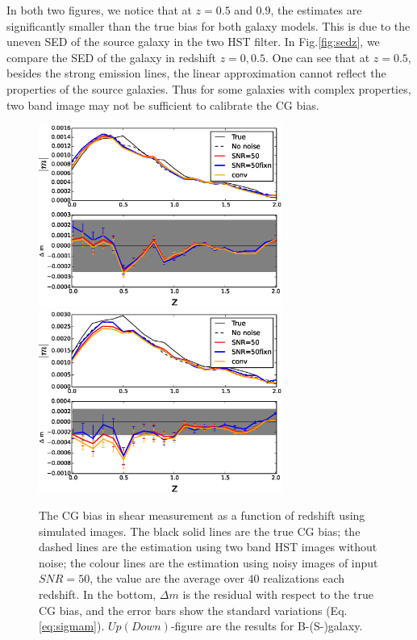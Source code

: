 \documentclass[useAMS,usenatbib]{mn2e}
\begin{document}
In both two figures, we notice that at $z=0.5$ and $0.9$, the estimates are
significantly smaller than the true bias for both galaxy models. This is
due to the uneven SED of the source galaxy in the two HST filter. In
Fig.\ref{fig:sedz}, we compare the SED of the galaxy in redshift
$z=0,0.5$. One can see that at $z=0.5$, besides the strong emission
lines, the linear approximation cannot reflect the properties of the
source galaxies. Thus for some galaxies with complex properties, two band
image may not be sufficient to calibrate the CG bias.
\begin{figure}
  \includegraphics[width=8.0cm]{zs2n_b_snrtt50.eps}
  \includegraphics[width=8.0cm]{zs2n_s_snrtt50.eps}
\caption{The CG bias in shear measurement as a function of redshift
  using simulated images. The black solid lines are the true CG bias;
  the dashed lines are the estimation using two band HST images
  without noise; the colour lines are the estimation using noisy
  images of input $SNR=50$, the value are the average over $40$
  realizations each redshift. In the bottom, $\Delta m$ is the
  residual with respect to the true CG bias, and the error bars show
  the standard variations (Eq.\ref{eq:sigmam}). $Up(Down)$-figure are
  the results for B-(S-)galaxy.}
\label{fig:biasofz50}
\end{figure}
\end{document}
